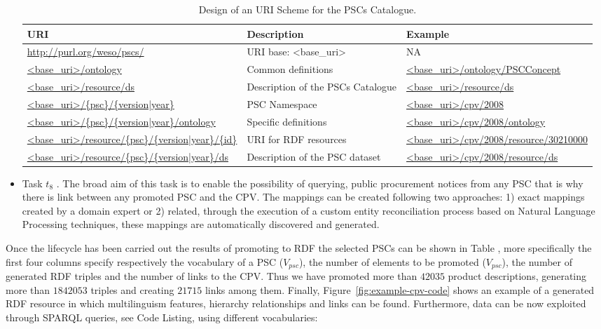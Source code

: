 \documentclass[preprint,12pt]{elsarticle}
\begin{document}
\begin{itemize}
 
 \begin{table}[!ht]
\renewcommand{\arraystretch}{1.3}
\begin{center}
\begin{tabular}[c]{|p{5cm}|p{4.5cm}|p{5cm}|} 
\hline
  \textbf{URI} &  \textbf{Description} & \textbf{Example} \\\hline
  \url{http://purl.org/weso/pscs/} & URI base: <base\_uri> & NA \\ \hline
  \url{<base_uri>/ontology} & Common definitions & \url{<base_uri>/ontology/PSCConcept} \\ \hline
  \url{<base_uri>/resource/ds} & Description of the PSCs Catalogue & \url{<base_uri>/resource/ds} \\ \hline
  \url{<base_uri>/{psc}/{version|year}} & PSC Namespace & \url{<base_uri>/cpv/2008} \\ \hline
  \url{<base_uri>/{psc}/{version|year}/ontology} & Specific definitions & \url{<base_uri>/cpv/2008/ontology} \\ \hline
  \url{<base_uri>/resource/{psc}/{version|year}/{id}} & URI for RDF resources & \url{<base_uri>/cpv/2008/resource/30210000} \\ \hline
  \url{<base_uri>/resource/{psc}/{version|year}/ds} & Description of the PSC dataset  & \url{<base_uri>/cpv/2008/resource/ds} \\ \hline
\hline
\end{tabular}
\caption{Design of an URI Scheme for the PSCs Catalogue.}\label{table:pscs-uri}
  \end{center}
\end{table} 

\item Task $t_8$ . The broad aim of this task is to enable the possibility of querying, 
public procurement notices from any PSC that is why there is link between any promoted PSC and the CPV. 
The mappings can be created following two approaches: 1) exact mappings created by a domain expert or 2) related, 
through the execution of a custom entity reconciliation process based on Natural Language Processing techniques, 
these mappings are automatically discovered and generated.

\end{itemize}

Once the lifecycle has been carried out the results of promoting to RDF the selected PSCs can be shown in Table , 
more specifically the first four columns specify respectively the vocabulary of a PSC ($V_{psc}$), the number of elements 
to be promoted ($V_{psc}$), the number of generated RDF triples and the number of links to the CPV. 
Thus we have promoted more than $42035$ product descriptions, generating more than $1842053$ triples and creating $21715$ 
links among them. Finally, Figure~\ref{fig:example-cpv-code}  shows an example of a generated RDF resource in which multilinguism features, 
hierarchy relationships and links can be found. Furthermore, data can be now exploited through SPARQL queries, 
see Code Listing, using different vocabularies:
\end{document}
